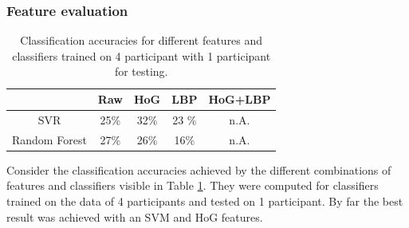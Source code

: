 \documentclass[10pt,twocolumn,letterpaper]{article}
\begin{document}
	\subsubsection{Feature evaluation}
	\begin{table}
		\begin{tabular}{c|c|c|c|c}
			& Raw & HoG & LBP & HoG+LBP \\ 
			\hline 
			SVR & 25\% & 32\% & 23 \% & n.A. \\ 
			\hline 
			Random Forest & 27\% & 26\% & 16\% & n.A. \\ 
		\end{tabular} 
		\caption{Classification accuracies for different features and classifiers trained on 4 participant with 1 participant for testing.}
		\label{hand_estimation_features}
	\end{table}
	Consider the classification accuracies achieved by the different combinations of features and classifiers visible in Table \ref{hand_estimation_features}. They were computed for classifiers trained on the data of 4 participants and tested on 1 participant. By far the best result was achieved with an SVM and HoG features.
	
\end{document}
